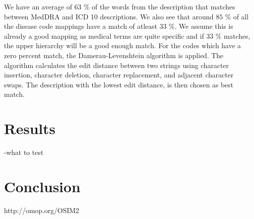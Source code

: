 We have an average of $63$ \% of the words from the description that matches between MedDRA and ICD 10 descriptions. We also see that around $85$ \% of all the disease code mappings have a match of atleast $33$ \%. We assume this is already a good mapping as medical terms are quite specific and if $33$ \% matches, the upper hierarchy will be a good enough match. For the codes which have a zero percent match, the Damerau-Levenshtein algorithm \cite{edit:article} is applied. The algorithm calculates the edit distance between two strings using character insertion, character deletion, character replacement, and adjacent character swaps. The description with the lowest edit distance, is then chosen as best match.

\section{Results}
-what to test

\section{Conclusion}


http://omop.org/OSIM2



